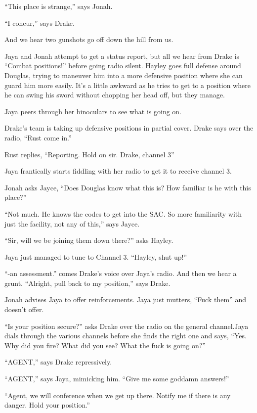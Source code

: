 ``This place is strange,'' says Jonah.

``I concur,'' says Drake. 

And we hear two gunshots go off down the hill from us.



Jaya and Jonah attempt to get a status report, but all we hear from Drake is ``Combat positions!'' before going radio silent.  Hayley goes full defense around Douglas, trying to maneuver him into a more defensive position where she can guard him more easily.  It's a little awkward as he tries to get to a position where he can swing his sword without chopping her head off, but they manage.

Jaya peers through her binoculars to see what is going on.

Drake's team is taking up defensive positions in partial cover.  Drake says over the radio, ``Rust come in.''  

Rust replies, ``Reporting.  Hold on sir.  Drake, channel 3''  

Jaya frantically starts fiddling with her radio to get it to receive channel 3.

Jonah asks Jayce, ``Does Douglas know what this is?  How familiar is he with this place?''

``Not much.  He knows the codes to get into the SAC.  So more familiarity with just the facility, not any of this,'' says Jayce.

``Sir, will we be joining them down there?'' asks Hayley.

Jaya just managed to tune to Channel 3.  ``Hayley, shut up!''

``-an assessment.'' comes Drake's voice over Jaya's radio.  And then we hear a grunt.  ``Alright, pull back to my position,'' says Drake.

Jonah advises Jaya to offer reinforcements.  Jaya just mutters, ``Fuck them'' and doesn't offer.

``Is your position secure?'' asks Drake over the radio on the general channel.Jaya dials through the various channels before she finds the right one and says, ``Yes.  Why did you fire?  What did you see?  What the fuck is going on?''

``AGENT,'' says Drake repressively.

``AGENT,'' says Jaya, mimicking him.  ``Give me some goddamn answers!''

``Agent, we will conference when we get up there. Notify me if there is any danger.  Hold your position.''

